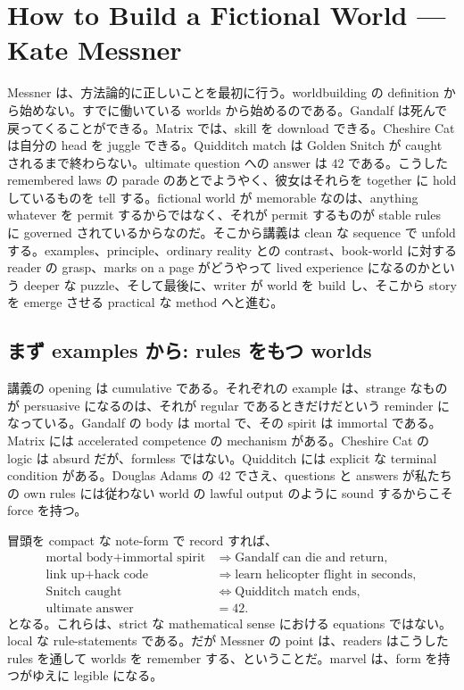 \chapter{How to Build a Fictional World --- Kate Messner}

Messner は、方法論的に正しいことを最初に行う。worldbuilding の definition から始めない。すでに働いている worlds から始めるのである。Gandalf は死んで戻ってくることができる。Matrix では、skill を download できる。Cheshire Cat は自分の head を juggle できる。Quidditch match は Golden Snitch が caught されるまで終わらない。ultimate question への answer は \(42\) である。こうした remembered laws の parade のあとでようやく、彼女はそれらを together に hold しているものを tell する。fictional world が memorable なのは、anything whatever を permit するからではなく、それが permit するものが stable rules に governed されているからなのだ。そこから講義は clean な sequence で unfold する。examples、principle、ordinary reality との contrast、book-world に対する reader の grasp、marks on a page がどうやって lived experience になるのかという deeper な puzzle、そして最後に、writer が world を build し、そこから story を emerge させる practical な method へと進む。

\section{まず examples から: rules をもつ worlds}

講義の opening は cumulative である。それぞれの example は、strange なものが persuasive になるのは、それが regular であるときだけだという reminder になっている。Gandalf の body は mortal で、その spirit は immortal である。Matrix には accelerated competence の mechanism がある。Cheshire Cat の logic は absurd だが、formless ではない。Quidditch には explicit な terminal condition がある。Douglas Adams の \(42\) でさえ、questions と answers が私たちの own rules には従わない world の lawful output のように sound するからこそ force を持つ。

冒頭を compact な note-form で record すれば、
\begin{align}
\text{mortal body} + \text{immortal spirit} &\Rightarrow \text{Gandalf can die and return},\\
\text{link up} + \text{hack code} &\Rightarrow \text{learn helicopter flight in seconds},\\
\text{Snitch caught} &\iff \text{Quidditch match ends},\\
\text{ultimate answer} &= 42.
\end{align}
となる。これらは、strict な mathematical sense における equations ではない。local な rule-statements である。だが Messner の point は、readers はこうした rules を通して worlds を remember する、ということだ。marvel は、form を持つがゆえに legible になる。

